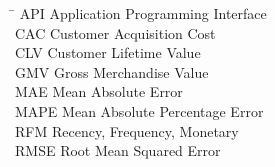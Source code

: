 \begin{tabbing}
  \hspace{4cm}\= \kill
  \textenglish{API}  \> \textenglish{Application Programming Interface} \\
  \textenglish{CAC}  \> \textenglish{Customer Acquisition Cost} \\
  \textenglish{CLV}  \> \textenglish{Customer Lifetime Value} \\
  \textenglish{GMV}  \> \textenglish{Gross Merchandise Value} \\
  \textenglish{MAE}  \> \textenglish{Mean Absolute Error} \\
  \textenglish{MAPE} \> \textenglish{Mean Absolute Percentage Error} \\
  \textenglish{RFM}  \> \textenglish{Recency, Frequency, Monetary} \\
  \textenglish{RMSE} \> \textenglish{Root Mean Squared Error} \\
\end{tabbing}

\clearpage

